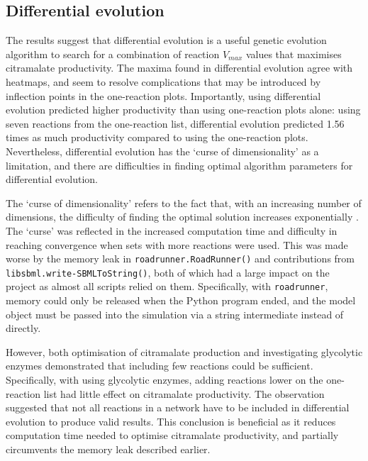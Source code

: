 \documentclass[parskip=full, numbers=noenddot]{scrreprt}
\begin{document}

\subsection{Differential evolution}
\label{ssec:discussion-kinetic-de}

The results suggest that differential evolution is a useful genetic evolution algorithm to search for a combination of reaction $V_{max}$ values that maximises citramalate productivity. The maxima found in differential evolution agree with heatmaps, and seem to resolve complications that may be introduced by inflection points in the one-reaction plots. Importantly, using differential evolution predicted higher productivity than using one-reaction plots alone: using seven reactions from the one-reaction list, differential evolution predicted 1.56 times as much productivity compared to using the one-reaction plots.
Nevertheless, differential evolution has the `curse of dimensionality' as a limitation, and there are difficulties in finding optimal algorithm parameters for differential evolution.

The `curse of dimensionality' refers to the fact that, with an increasing number of dimensions, the difficulty of finding the optimal solution increases exponentially \citep{mier_small_2017}. The `curse' was reflected in the increased computation time and difficulty in reaching convergence when sets with more reactions were used. This was made worse by the memory leak in \texttt{roadrunner.RoadRunner()} and contributions from \texttt{libsbml.write-SBML\-To\-String()}, both of which had a large impact on the project as almost all scripts relied on them. Specifically, with \texttt{roadrunner}, memory could only be released when the Python program ended, and the model object must be passed into the simulation via a string intermediate instead of directly.

However, both optimisation of citramalate production and investigating glycolytic enzymes demonstrated that including few reactions could be sufficient. Specifically, with using glycolytic enzymes, adding reactions lower on the one-reaction list had little effect on citramalate productivity. The observation suggested that not all reactions in a network have to be included in differential evolution to produce valid results. This conclusion is beneficial as it reduces computation time needed to optimise citramalate productivity, and partially circumvents the memory leak described earlier.
\end{document}
